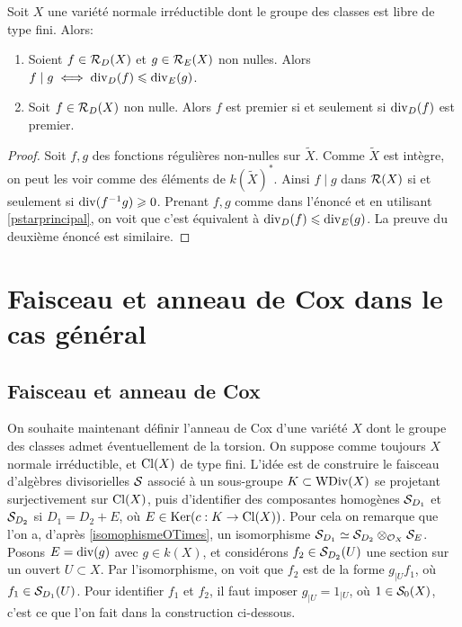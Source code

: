 \begin{prop}\label{divisibilitePropsFreeCox}
Soit $X$ une variété normale irréductible dont le groupe des classes est libre de type fini.  Alors:
\begin{enumerate}
\item Soient $f\in \mathcal{R}_D(X)$ et $g\in \mathcal{R}_E(X)$ non nulles. Alors $f\mid g\iff \operatorname{div}_D(f)\leqslant\operatorname{div}_E(g)$.
\item Soit $f\in \mathcal{R}_D(X)$ non nulle. Alors $f$ est premier si et seulement si $\operatorname{div}_D(f)$ est premier.
\end{enumerate}
\end{prop}
\begin{proof}
Soit $f,g$ des fonctions régulières non-nulles sur $\widetilde{X}$. Comme $\widetilde{X}$ est intègre, on peut les voir comme des éléments de $k(\widetilde{X})^*$. Ainsi $f\mid g$ dans $\mathcal{R}(X)$ si et seulement si $\operatorname{div}(f^{-1}g)\geqslant 0$. Prenant $f,g$ comme dans l'énoncé et en utilisant \ref{pstarprincipal}, on voit que c'est équivalent à $\operatorname{div}_D(f)\leqslant\operatorname{div}_E(g)$. La preuve du deuxième énoncé est similaire.
\end{proof}

\section{Faisceau et anneau de Cox dans le cas général}

\subsection{Faisceau et anneau de Cox}

On souhaite maintenant définir l'anneau de Cox d'une variété $X$ dont le groupe des classes admet éventuellement de la torsion. On suppose comme toujours $X$ normale irréductible, et $\operatorname{Cl}(X)$ de type fini. L'idée est de construire le faisceau d'algèbres divisorielles $\mathcal{S}$ associé à un sous-groupe $K\subset \operatorname{WDiv}(X)$ se projetant surjectivement sur $\operatorname{Cl}(X)$, puis d'identifier des composantes homogènes $\mathcal{S}_{D_1}$ et  $\mathcal{S}_{D_2}$ si $D_1=D_2+E$, où $E\in \operatorname{Ker} (c:K\rightarrow \operatorname{Cl}(X))$. Pour cela on remarque que l'on a, d'après \ref{isomophismeOTimes}, un isomorphisme $\mathcal{S}_{D_1}\simeq \mathcal{S}_{D_2}\otimes_{\mathcal{O}_X}\mathcal{S}_E$. Posons $E=\operatorname{div}(g)$ avec $g\in k(X)$, et considérons $f_2\in \mathcal{S}_{D_2}(U)$ une section sur un ouvert $U\subset X$. Par l'isomorphisme, on voit que $f_2$ est de la forme $g_{|U}f_1$, où $f_1\in \mathcal{S}_{D_1}(U)$. Pour identifier $f_1$ et $f_2$, il faut imposer $g_{|U}=1_{|U}$, où $1\in\mathcal{S}_0(X)$, c'est ce que l'on fait dans la construction ci-dessous.

